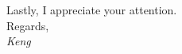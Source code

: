 \documentclass{resume} %
\begin{document}
Lastly, I appreciate your attention.\\


Regards,\\
{\em Keng}










% 
% 
\end{document}
